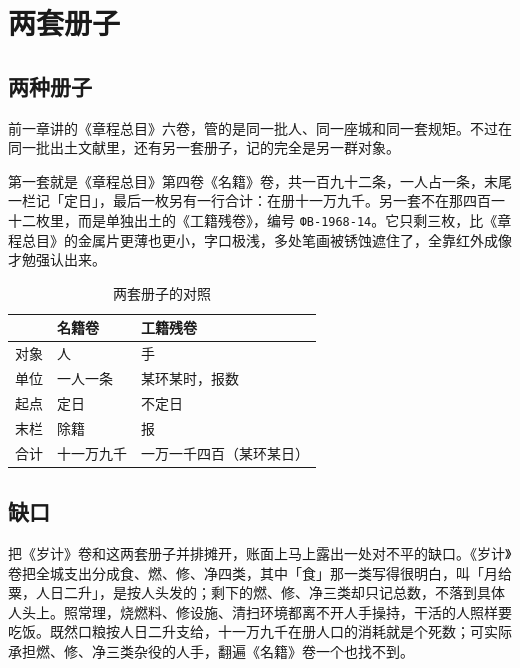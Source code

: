 \chapter{两套册子}


\section{两种册子}

前一章讲的《章程总目》六卷，管的是同一批人、同一座城和同一套规矩。不过在同一批出土文献里，还有另一套册子，记的完全是另一群对象。

第一套就是《章程总目》第四卷《名籍》卷，共一百九十二条，一人占一条，末尾一栏记「定日」，最后一枚另有一行合计：在册十一万九千。另一套不在那四百一十二枚里，而是单独出土的《工籍残卷》，编号 \texttt{ФВ-1968-14}。它只剩三枚，比《章程总目》的金属片更薄也更小，字口极浅，多处笔画被锈蚀遮住了，全靠红外成像才勉强认出来。

\begin{table}[htbp]
  \centering
  \caption{两套册子的对照}
  \begin{tabular}{@{}lll@{}}
    \toprule
    & 名籍卷 & 工籍残卷 \\
    \midrule
    对象 & 人 & 手 \\
    单位 & 一人一条 & 某环某时，报数 \\
    起点 & 定日 & 不定日 \\
    末栏 & 除籍 & 报 \\
    合计 & 十一万九千 & 一万一千四百（某环某日） \\
    \bottomrule
  \end{tabular}
\end{table}

\section{缺口}

把《岁计》卷和这两套册子并排摊开，账面上马上露出一处对不平的缺口。《岁计》卷把全城支出分成食、燃、修、净四类，其中「食」那一类写得很明白，叫「月给粟，人日二升」，是按人头发的；剩下的燃、修、净三类却只记总数，不落到具体人头上。照常理，烧燃料、修设施、清扫环境都离不开人手操持，干活的人照样要吃饭。既然口粮按人日二升支给，十一万九千在册人口的消耗就是个死数；可实际承担燃、修、净三类杂役的人手，翻遍《名籍》卷一个也找不到。

